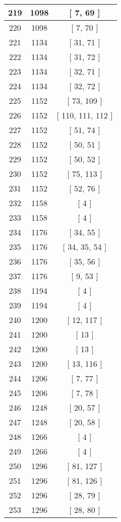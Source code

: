 \begin{center}
\begin{longtable}[H]{|| c c c ||}
\hline
219 & 1098 & [ 7, 69 ] \\ 
\hline
220 & 1098 & [ 7, 70 ] \\ 
\hline
221 & 1134 & [ 31, 71 ] \\ 
\hline
222 & 1134 & [ 31, 72 ] \\ 
\hline
223 & 1134 & [ 32, 71 ] \\ 
\hline
224 & 1134 & [ 32, 72 ] \\ 
\hline
225 & 1152 & [ 73, 109 ] \\ 
\hline
226 & 1152 & [ 110, 111, 112 ] \\ 
\hline
227 & 1152 & [ 51, 74 ] \\ 
\hline
228 & 1152 & [ 50, 51 ] \\ 
\hline
229 & 1152 & [ 50, 52 ] \\ 
\hline
230 & 1152 & [ 75, 113 ] \\ 
\hline
231 & 1152 & [ 52, 76 ] \\ 
\hline
232 & 1158 & [ 4 ] \\ 
\hline
233 & 1158 & [ 4 ] \\ 
\hline
234 & 1176 & [ 34, 55 ] \\ 
\hline
235 & 1176 & [ 34, 35, 54 ] \\ 
\hline
236 & 1176 & [ 35, 56 ] \\ 
\hline
237 & 1176 & [ 9, 53 ] \\ 
\hline
238 & 1194 & [ 4 ] \\ 
\hline
239 & 1194 & [ 4 ] \\ 
\hline
240 & 1200 & [ 12, 117 ] \\ 
\hline
241 & 1200 & [ 13 ] \\ 
\hline
242 & 1200 & [ 13 ] \\ 
\hline
243 & 1200 & [ 13, 116 ] \\ 
\hline
244 & 1206 & [ 7, 77 ] \\ 
\hline
245 & 1206 & [ 7, 78 ] \\ 
\hline
246 & 1248 & [ 20, 57 ] \\ 
\hline
247 & 1248 & [ 20, 58 ] \\ 
\hline
248 & 1266 & [ 4 ] \\ 
\hline
249 & 1266 & [ 4 ] \\ 
\hline
250 & 1296 & [ 81, 127 ] \\ 
\hline
251 & 1296 & [ 81, 126 ] \\ 
\hline
252 & 1296 & [ 28, 79 ] \\ 
\hline
253 & 1296 & [ 28, 80 ] \\ 
\hline

\end{longtable}
\end{center}
